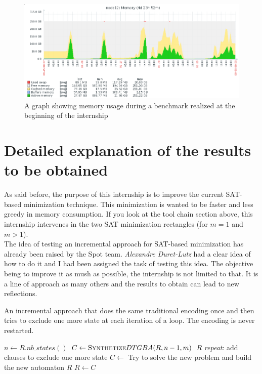 \begin{figure}[h]
 \centering
 \includegraphics[scale=0.5]{img/over_memory.png}
 \caption{A graph showing memory usage during a benchmark realized at the beginning of the internship}
 \label{fig:over_memory}
\end{figure}

\section{Detailed explanation of the results to be obtained}
As said before, the purpose of this internship is to improve the current SAT-based minimization technique.
This minimization is wanted to be faster and less greedy in memory consumption.
If you look at the tool chain section above, this internship intervenes in the two SAT minimization
rectangles (for $m=1$ and $m > 1$).\\

The idea of testing an incremental approach for SAT-based minimization has already been raised by the Spot
team. \textit{Alexandre Duret-Lutz} had a clear idea of how to do it and I had been assigned the task of
testing this idea. The objective being to improve it as mush as possible, the internship is not limited
to that. It is a line of approach as many others and the results to obtain can lead to new reflections.\\

\begin{algorithm}[H]
 \caption{An incremental approach that does the same traditional encoding once and then tries to exclude
          one more state at each iteration of a loop. The encoding is never restarted.}
 \label{incr1}
 \begin{algorithmic}[1]
   \State $n \gets R.nb\_states() $
   \State $C \gets \textsc{Synthetize}DTGBA(R,n-1,m) $
    \Return $R$\EndIf
   \BState \emph{repeat}:
   \State add clauses to exclude one more state
   \State $C \gets$ Try to solve the new problem and build the new automaton
    \Return $R$\EndIf
   \State $R \gets C$
  \EndProcedure
 \end{algorithmic}
\end{algorithm}

